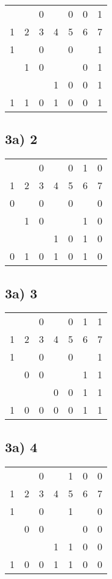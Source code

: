 \documentclass[]{article}
\begin{document}
\begin{longtable}[l]{@{}lllllll@{}}
	\toprule
	 & &0& &0&0&1\\
	1&2&3&4&5&6&7\\
	\endhead
	\midrule
	1& &0& &0& &1\\
	 &1&0& & &0&1\\
	 & & &1&0&0&1\\
	\hline
	1&1&0&1&0&0&1\\
	\bottomrule
\end{longtable}

\subsection{3a) 2}

\begin{longtable}[l]{@{}lllllll@{}}
	\toprule
	 & &0& &0&1&0\\
	1&2&3&4&5&6&7\\
	\endhead
	\midrule
	0& &0& &0& &0\\
	 &1&0& & &1&0\\
	 & & &1&0&1&0\\
	\hline
	0&1&0&1&0&1&0\\
	\bottomrule
\end{longtable}

\subsection{3a) 3}

\begin{longtable}[l]{@{}lllllll@{}}
	\toprule
	 & &0& &0&1&1\\
	1&2&3&4&5&6&7\\
	\endhead
	\midrule
	1& &0& &0& &1\\
	 &0&0& & &1&1\\
	 & & &0&0&1&1\\
	\hline
	1&0&0&0&0&1&1\\
	\bottomrule
\end{longtable}

\pagebreak

\subsection{3a) 4}

\begin{longtable}[l]{@{}lllllll@{}}
	\toprule
	 & &0& &1&0&0\\
	1&2&3&4&5&6&7\\
	\endhead
	\midrule
	1& &0& &1& &0\\
	 &0&0& & &0&0\\
	 & & &1&1&0&0\\
	\hline
	1&0&0&1&1&0&0\\
	\bottomrule
\end{longtable}
\end{document}
